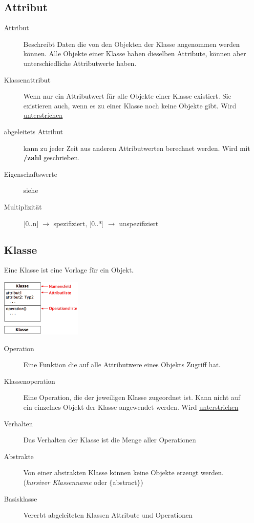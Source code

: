 \subsection{Attribut }
  \begin{description}
    \item[Attribut] 
      Beschreibt Daten die von den Objekten der Klasse angenommen
      werden können. Alle Objekte einer Klasse haben dieselben Attribute, können
      aber unterschiedliche Attributwerte haben.
    \item[Klassenattribut] 
      Wenn nur ein Attributwert für alle Objekte einer Klasse existiert. 
      Sie existieren auch, wenn es zu einer Klasse noch keine Objekte gibt.
      Wird \underline{unterstrichen}
    \item[abgeleitets Attribut]
      kann zu jeder Zeit aus anderen Attributwerten berechnet werden. Wird mit \textbf{/zahl} geschrieben.  
    \item[Eigenschaftswerte]
      siehe       
    \item[Multiplizität]
      [0..n] $\rightarrow$ spezifiziert, [0..*] $\rightarrow$ unspezifiziert
  \end{description}
  
\subsection{Klasse }
  Eine Klasse ist eine Vorlage für ein Objekt.\\
 \begin{minipage}[t]{4cm}\includegraphics[width=4cm]{./bilder/klasse}\end{minipage}
 \begin{minipage}{15cm}
   \begin{description}
    \item[Operation] 
      Eine Funktion die auf alle Attributwere eines Objekts Zugriff hat.
    \item[Klassenoperation] 
      Eine Operation, die der jeweiligen Klasse zugeordnet ist. 
      Kann nicht auf 
      ein einzelnes Objekt der Klasse angewendet werden. Wird \underline{unterstrichen}
    \item[Verhalten] 
      Das Verhalten der Klasse ist die Menge aller Operationen
    \item[Abstrakte] 
      Von einer abstrakten Klasse können keine Objekte erzeugt werden. 
      (\textit{kursiver Klassenname} oder $\lbrace$abstract$\rbrace$)
    \item[Basisklasse] 
      Vererbt abgeleiteten Klassen Attribute und Operationen
  \end{description}
  \end{minipage}
  
